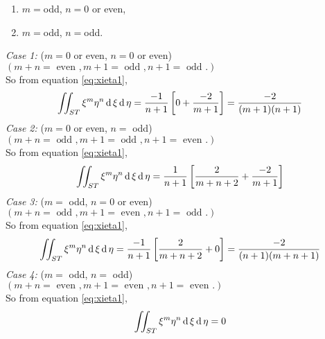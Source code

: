 \documentclass[../main-sheet.tex]{subfiles}
\begin{document}
\begin{soln}
\begin{enumerate}[label=(\roman*)]
    \item \(m=\)odd, \(n=0\) or even,
    \item \(m=\)odd, \(n=\)odd.
\end{enumerate}
\emph{Case 1: } (\(m=0\) or even, \(n=0\) or even)\\
\((m+n=\text{ even }, m+1=\text{ odd }, n+1=\text{ odd }.)\)\\
So from equation \eqref{eq:xieta1},
\[
    \iint_{ST} \xi^m \eta^n \,\mathrm{d}\, \xi\,\mathrm{d}\, \eta=
    \frac{-1}{n+1}\left[ 0+ \frac{-2}{m+1}\right]=\frac{-2}{(m+1)(n+1)}
\]
\emph{Case 2: } (\(m=0\) or even, \(n=\) odd)\\
\((m+n=\text{ odd }, m+1=\text{ odd }, n+1=\text{ even }.)\)\\
So from equation \eqref{eq:xieta1},
\[
    \iint_{ST} \xi^m \eta^n \,\mathrm{d}\, \xi\,\mathrm{d}\, \eta=
    \frac{1}{n+1}\left[ \frac{2}{m+n+2}+ \frac{-2}{m+1}\right]
\]
\emph{Case 3: } (\(m=\) odd, \(n=0\) or even)\\
\((m+n=\text{ odd }, m+1=\text{ even }, n+1=\text{ odd }.)\)\\
So from equation \eqref{eq:xieta1},
\[
    \iint_{ST} \xi^m \eta^n \,\mathrm{d}\, \xi\,\mathrm{d}\, \eta=
    \frac{-1}{n+1}\left[ \frac{2}{m+n+2}+ 0\right]=\frac{-2}{(n+1)(m+n+1)}
\]
\emph{Case 4: } (\(m=\) odd, \(n=\) odd)\\
\((m+n=\text{ even }, m+1=\text{ even }, n+1=\text{ even }.)\)\\
So from equation \eqref{eq:xieta1},
\[
    \iint_{ST} \xi^m \eta^n \,\mathrm{d}\, \xi\,\mathrm{d}\, \eta=0
\]
\end{soln}
\end{document}
